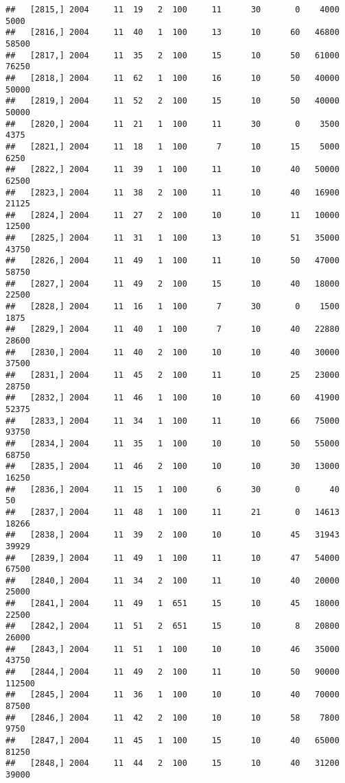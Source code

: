 \documentclass{article}\usepackage[]{graphicx}\usepackage[]{color}
\makeatletter
\newenvironment{kframe}{%
 \def\at@end@of@kframe{}%
 \ifinner\ifhmode%
  \def\at@end@of@kframe{\end{minipage}}%
  \begin{minipage}{\columnwidth}%
 \fi\fi%
 \def\FrameCommand##1{\hskip\@totalleftmargin \hskip-\fboxsep
 \colorbox{shadecolor}{##1}\hskip-\fboxsep
     \hskip-\linewidth \hskip-\@totalleftmargin \hskip\columnwidth}%
 \MakeFramed {\advance\hsize-\width
   \@totalleftmargin\z@ \linewidth\hsize
   \@setminipage}}%
 {\par\unskip\endMakeFramed%
 \at@end@of@kframe}
\newenvironment{knitrout}{}{} %
\makeatother
\begin{document}
\begin{knitrout}
\begin{kframe}
\begin{verbatim}
##   [2815,] 2004     11  19   2  100     11      30       0    4000    5000
##   [2816,] 2004     11  40   1  100     13      10      60   46800   58500
##   [2817,] 2004     11  35   2  100     15      10      50   61000   76250
##   [2818,] 2004     11  62   1  100     16      10      50   40000   50000
##   [2819,] 2004     11  52   2  100     15      10      50   40000   50000
##   [2820,] 2004     11  21   1  100     11      30       0    3500    4375
##   [2821,] 2004     11  18   1  100      7      10      15    5000    6250
##   [2822,] 2004     11  39   1  100     11      10      40   50000   62500
##   [2823,] 2004     11  38   2  100     11      10      40   16900   21125
##   [2824,] 2004     11  27   2  100     10      10      11   10000   12500
##   [2825,] 2004     11  31   1  100     13      10      51   35000   43750
##   [2826,] 2004     11  49   1  100     11      10      50   47000   58750
##   [2827,] 2004     11  49   2  100     15      10      40   18000   22500
##   [2828,] 2004     11  16   1  100      7      30       0    1500    1875
##   [2829,] 2004     11  40   1  100      7      10      40   22880   28600
##   [2830,] 2004     11  40   2  100     10      10      40   30000   37500
##   [2831,] 2004     11  45   2  100     11      10      25   23000   28750
##   [2832,] 2004     11  46   1  100     10      10      60   41900   52375
##   [2833,] 2004     11  34   1  100     11      10      66   75000   93750
##   [2834,] 2004     11  35   1  100     10      10      50   55000   68750
##   [2835,] 2004     11  46   2  100     10      10      30   13000   16250
##   [2836,] 2004     11  15   1  100      6      30       0      40      50
##   [2837,] 2004     11  48   1  100     11      21       0   14613   18266
##   [2838,] 2004     11  39   2  100     10      10      45   31943   39929
##   [2839,] 2004     11  49   1  100     11      10      47   54000   67500
##   [2840,] 2004     11  34   2  100     11      10      40   20000   25000
##   [2841,] 2004     11  49   1  651     15      10      45   18000   22500
##   [2842,] 2004     11  51   2  651     15      10       8   20800   26000
##   [2843,] 2004     11  51   1  100     10      10      46   35000   43750
##   [2844,] 2004     11  49   2  100     11      10      50   90000  112500
##   [2845,] 2004     11  36   1  100     10      10      40   70000   87500
##   [2846,] 2004     11  42   2  100     10      10      58    7800    9750
##   [2847,] 2004     11  45   1  100     15      10      40   65000   81250
##   [2848,] 2004     11  44   2  100     15      10      40   31200   39000

\end{verbatim}
\end{kframe}
\end{knitrout}
\end{document}
